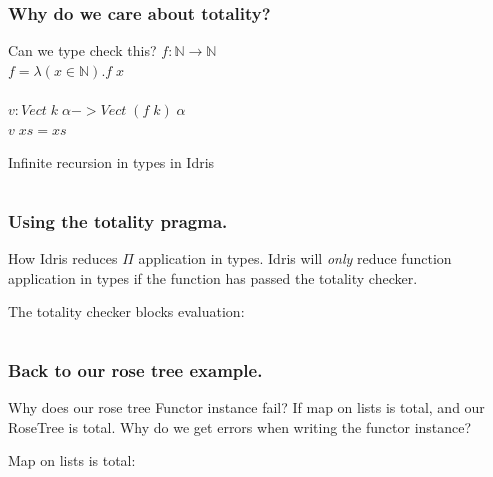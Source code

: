 \documentclass
  [hyperref={colorlinks = true,linkcolor = blue, 
             citecolor = blue, urlcolor = blue}
  ]{beamer}
\begin{document}
\begin{frame}[fragile]
\frametitle{Why do we care about totality?}
\begin{block}{Can we type check this?}
$f : \mathbb{N} \rightarrow \mathbb{N}$ \\
$f = \lambda(x \in \mathbb{N}).f\;x$ \\
$\;$\\
$v : Vect\;k\;\alpha -> Vect\; (f\;k)\;\alpha$ \\
$v\;xs = xs$
\end{block}

\begin{block}{Infinite recursion in types in Idris}
  \inputminted{idris}{../Code/src/ForeverExample.idr}
\end{block}
\end{frame}

\begin{frame}[fragile]
\frametitle{Using the totality pragma.}

\begin{block}{How Idris reduces $\Pi$ application in types.}
Idris will \textit{only} reduce function application in types
if the function has passed the totality checker.
\end{block}

\begin{block}{The totality checker blocks evaluation:}
  \inputminted{idris}{../Code/src/ForeverExampleFail.idr}
\end{block}
\end{frame}

\begin{frame}[fragile]
\frametitle{Back to our rose tree example.}
\begin{block}{Why does our rose tree Functor instance fail?}
If map on lists is total, and our RoseTree is total. Why do we get
errors when writing the functor instance?
\end{block}

\begin{block}{Map on lists is total:}
  \inputminted{idris}{../Code/src/TotalMapList.idr}
\end{block}
\end{frame}
\end{document}
